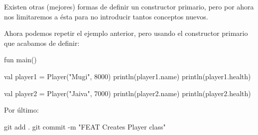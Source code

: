    \begin{note}
      Existen otras (mejores) formas de definir un constructor primario, pero por ahora nos 
      limitaremos a ésta para no introducir tantos conceptos nuevos.
    \end{note}

    Ahora podemos repetir el ejemplo anterior, pero usando el constructor primario que acabamos de
    definir:

    \begin{kotlin}
      fun main() {
        val player1 = Player("Mugi", 8000)
        println(player1.name)
        println(player1.health)

        val player2 = Player("Jaiva", 7000)
        println(player2.name)
        println(player2.health)
      }
    \end{kotlin}

    Por último:

    \begin{powershell}
      git add .
      git commit -m "FEAT Creates Player class"
    \end{powershell}